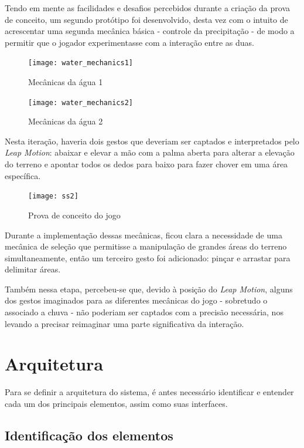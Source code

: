 Tendo em mente as facilidades e desafios percebidos durante a criação da prova de conceito, um segundo protótipo foi desenvolvido, desta vez com o intuito de acrescentar uma segunda mecânica básica - controle da precipitação - de modo a permitir que o jogador experimentasse com a interação entre as duas.

\begin{figure}[ht]
	\centering
	\texttt{[image: water\_mechanics1]}
	\caption{Mecânicas da água 1}
\end{figure}

\begin{figure}[ht]
	\centering
	\texttt{[image: water\_mechanics2]}
	\caption{Mecânicas da água 2}
\end{figure}

Nesta iteração, haveria dois gestos que deveriam ser captados e interpretados pelo \textit{Leap Motion}: abaixar e elevar a mão com a palma aberta para alterar a elevação do terreno e apontar todos os dedos para baixo para fazer chover em uma área específica.

\begin{figure}[ht]
	\centering
	\texttt{[image: ss2]}
	\caption{Prova de conceito do jogo}
\end{figure}

Durante a implementação dessas mecânicas, ficou clara a necessidade de uma mecânica de seleção que permitisse a manipulação de grandes áreas do terreno simultaneamente, então um terceiro gesto foi adicionado: pinçar e arrastar para delimitar áreas.

Também nessa etapa, percebeu-se que, devido à posição do \textit{Leap Motion}, alguns dos gestos imaginados para as diferentes mecânicas do jogo - sobretudo o associado a chuva - não poderiam ser captados com a precisão necessária, nos levando a precisar reimaginar uma parte significativa da interação.



\section{Arquitetura}\label{sec-desenvolvimento-arquitetura}

Para se definir a arquitetura do sistema, é antes necessário identificar e entender cada um dos principais elementos, assim como suas interfaces.

\subsection{Identificação dos elementos}\label{subsec-identificacao-elementos}

